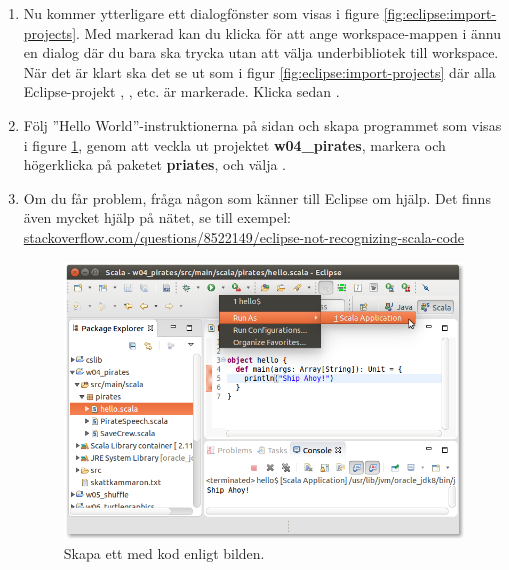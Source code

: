 \begin{enumerate}
\item Nu kommer ytterligare ett dialogfönster som visas i figure \ref{fig:eclipse:import-projects}. Med  markerad kan du klicka  för att ange workspace-mappen i ännu en dialog där du bara ska trycka  utan att välja underbibliotek till workspace. När det är klart ska det se ut som i figur \ref{fig:eclipse:import-projects} där alla Eclipse-projekt , , etc. är markerade. Klicka sedan .

\item Följ ''Hello World''-instruktionerna på sidan \pageref{subsubsection:eclipse:hello-world} och skapa programmet som visas i figure \ref{fig:eclipse:pirates-hi}, genom att veckla ut projektet \textbf{w04\_pirates}, markera och högerklicka på paketet \textbf{priates}, och välja .

\item Om du får problem, fråga någon som känner till Eclipse om hjälp. Det finns även mycket hjälp på nätet, se till exempel: \\ \href{http://stackoverflow.com/questions/8522149/eclipse-not-recognizing-scala-code}{stackoverflow.com/questions/8522149/eclipse-not-recognizing-scala-code}

\begin{figure}[H]
\centering
\includegraphics[width=1.0\textwidth]{../img/eclipse/eclipse-pirates-hello.png}
\caption {Skapa ett  med kod enligt bilden.}
\label{fig:eclipse:pirates-hi}
\end{figure}


\end{enumerate}


